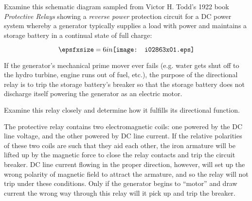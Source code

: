 

Examine this schematic diagram sampled from Victor H. Todd's 1922 book {\it Protective Relays} showing a {\it reverse power} protection circuit for a DC power system whereby a generator typically supplies a load with power and maintains a storage battery in a continual state of full charge:

$$\epsfxsize=6in \texttt{[image: i02863x01.eps]}$$

If the generator's mechanical prime mover ever fails (e.g. water gets shut off to the hydro turbine, engine runs out of fuel, etc.), the purpose of the directional relay is to trip the storage battery's breaker so that the storage battery does not discharge itself powering the generator as an electric motor.

\vskip 10pt

Examine this relay closely and determine how it fulfills its directional function.

\vskip 10pt







The protective relay contains two electromagnetic coils: one powered by the DC line voltage, and the other powered by DC line current.  If the relative polarities of these two coils are such that they aid each other, the iron armature will be lifted up by the magnetic force to close the relay contacts and trip the circuit breaker.  DC line current flowing in the proper direction, however, will set up the wrong polarity of magnetic field to attract the armature, and so the relay will not trip under these conditions.  Only if the generator begins to ``motor'' and draw current the wrong way through this relay will it pick up and trip the breaker.
 











